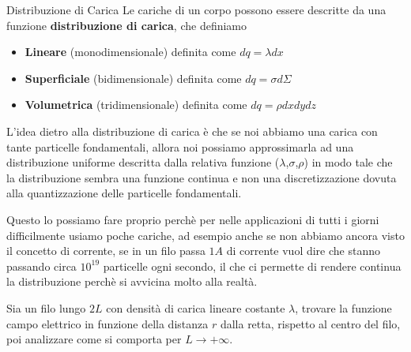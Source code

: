 \documentclass{rapport}
\begin{document}
\begin{definizione}{Distribuzione di Carica}{}
  Le cariche di un corpo possono essere descritte da una funzione \textbf{distribuzione di carica}, che definiamo 
  \begin{itemize}
    \item \textbf{Lineare} (monodimensionale) definita come 
    $dq = \lambda dx$
    \item \textbf{Superficiale} (bidimensionale) definita come 
    $dq = \sigma d\Sigma$
     \item \textbf{Volumetrica} (tridimensionale) definita come 
   $ dq = \rho dxdydz$
  \end{itemize}
\end{definizione}

L'idea dietro alla distribuzione di carica è che se noi abbiamo una carica con tante particelle fondamentali, allora noi possiamo approssimarla ad una distribuzione uniforme descritta dalla relativa funzione ($\lambda$,$\sigma$,$\rho$) in modo tale che la distribuzione sembra una funzione continua e non una discretizzazione dovuta alla quantizzazione delle particelle fondamentali.

Questo lo possiamo fare proprio perchè per nelle applicazioni di tutti i giorni difficilmente usiamo poche cariche, ad esempio anche se non abbiamo ancora visto il concetto di corrente, se in un filo passa $1A$ di corrente vuol dire che stanno passando circa $10^{19}$ particelle ogni secondo, il che ci permette di rendere continua la distribuzione perchè si avvicina molto alla realtà.


\begin{esercizio}{}{}
  Sia un filo lungo $2L$ con densità di carica lineare costante $\lambda$, trovare la funzione campo elettrico in funzione della distanza $r$ dalla retta, rispetto al centro del filo, poi analizzare come si comporta per $L\to +\infty$.
\end{esercizio}
\end{document}
